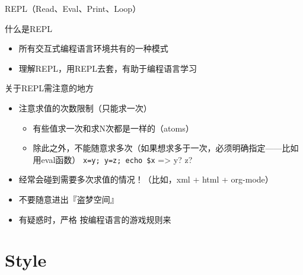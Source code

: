 \documentclass[presentation,dvipdfmx,CJKbookmarks]{beamer}
\begin{document}
\begin{CJK*}{UTF8}{simsun}
\begin{frame}[label={sec:orgde23a30},fragile]{REPL（Read、Eval、Print、Loop）}
 \begin{block}{什么是\thinspace REPL}
\begin{itemize}
\item 所有交互式编程语言环境共有的一种模式
\item 理解\thinspace REPL，用\thinspace REPL\thinspace 去套，有助于编程语言学习
\end{itemize}
\end{block}
\begin{block}{关于\thinspace REPL\thinspace 需注意的地方}
\begin{itemize}
\item 注意求值的次数限制（只能求一次）
\begin{itemize}
\item 有些值求一次和求\thinspace N\thinspace 次都是一样的（atoms）
\item 除此之外，不能随意求多次（如果想求多于一次，必须明确指定——比如用\thinspace eval\thinspace 函数）
\texttt{x=y; y=z; echo \$x} => y? z?
\end{itemize}
\item 经常会碰到需要多次求值的情况！（比如，xml + html + org-mode）
\item 不要随意进出『盗梦空间』
\item 有疑惑时，\alert{严格} 按编程语言的游戏规则来
\end{itemize}
\end{block}
\end{frame}

\section{Style}
\label{sec:orge1424c0}


\end{CJK*}
\end{document}
